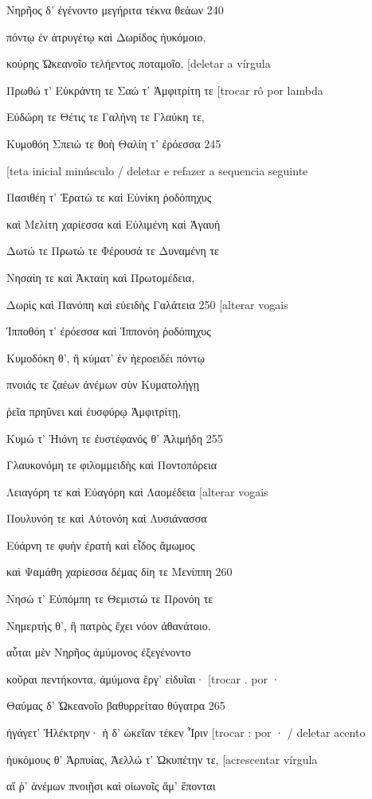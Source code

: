 Νηρῆος δ' ἐγένοντο μεγήριτα τέκνα θεάων 240

πόντῳ ἐν ἀτρυγέτῳ καὶ Δωρίδος ἠυκόμοιο,

κούρης Ὠκεανοῖο τελήεντος ποταμοῖο, {[}deletar a vírgula

Πρωθώ τ' Εὐκράντη τε Σαώ τ' Ἀμφιτρίτη τε {[}trocar rô por lambda

Εὐδώρη τε Θέτις τε Γαλήνη τε Γλαύκη τε,

Κυμοθόη Σπειώ τε θοὴ Θαλίη τ' ἐρόεσσα 245

{[}teta inicial minúsculo / deletar e refazer a sequencia seguinte

Πασιθέη τ' Ἐρατώ τε καὶ Εὐνίκη ῥοδόπηχυς

καὶ Μελίτη χαρίεσσα καὶ Εὐλιμένη καὶ Ἀγαυὴ

Δωτώ τε Πρωτώ τε Φέρουσά τε Δυναμένη τε

Νησαίη τε καὶ Ἀκταίη καὶ Πρωτομέδεια,

Δωρὶς καὶ Πανόπη καὶ εὐειδὴς Γαλάτεια 250 {[}alterar vogais

Ἱπποθόη τ' ἐρόεσσα καὶ Ἱππονόη ῥοδόπηχυς

Κυμοδόκη θ', ἣ κύματ' ἐν ἠεροειδέι πόντῳ

πνοιάς τε ζαέων ἀνέμων σὺν Κυματολήγῃ

ῥεῖα πρηΰνει καὶ ἐυσφύρῳ Ἀμφιτρίτῃ,

Κυμώ τ' Ἠιόνη τε ἐυστέφανός θ' Ἁλιμήδη 255

Γλαυκονόμη τε φιλομμειδὴς καὶ Ποντοπόρεια

Λειαγόρη τε καὶ Εὐαγόρη καὶ Λαομέδεια {[}alterar vogais

Πουλυνόη τε καὶ Αὐτονόη καὶ Λυσιάνασσα

Εὐάρνη τε φυὴν ἐρατὴ καὶ εἶδος ἄμωμος

καὶ Ψαμάθη χαρίεσσα δέμας δίη τε Μενίππη 260

Νησώ τ' Εὐπόμπη τε Θεμιστώ τε Προνόη τε

Νημερτής θ', ἣ πατρὸς ἔχει νόον ἀθανάτοιο.

αὗται μὲν Νηρῆος ἀμύμονος ἐξεγένοντο

κοῦραι πεντήκοντα, ἀμύμονα ἔργ' εἰδυῖαι· {[}trocar . por ·

Θαύμας δ' Ὠκεανοῖο βαθυρρείταο θύγατρα 265

ἠγάγετ' Ἠλέκτρην· ἡ δ' ὠκεῖαν τέκεν Ἶριν {[}trocar : por · / deletar
acento

ἠυκόμους θ' Ἁρπυίας, Ἀελλώ τ' Ὠκυπέτην τε, {[}acrescentar vírgula

αἵ ῥ' ἀνέμων πνοιῇσι καὶ οἰωνοῖς ἅμ' ἕπονται

